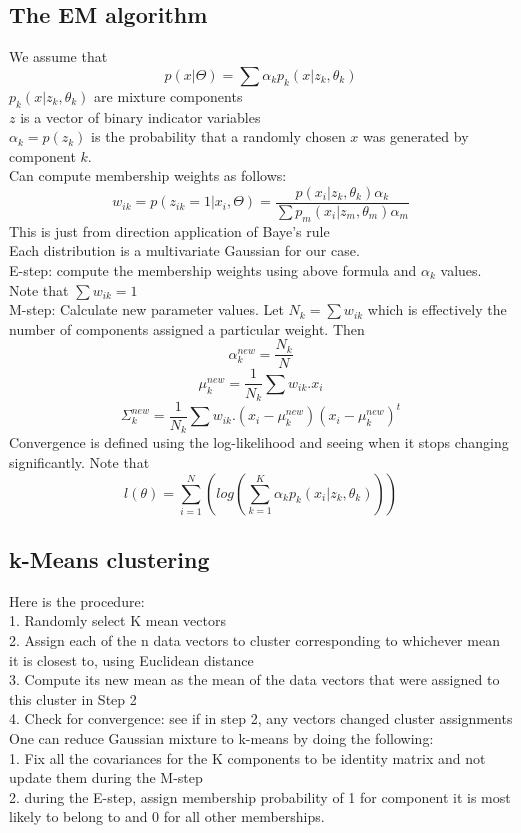 \documentclass[11pt,psfig]{article}
\begin{document}
\subsection*{The EM algorithm}

We assume that
\[
p(x|\Theta) = \sum{\alpha_k p_k(x|z_k,\theta_k)}
\]
$p_k(x|z_k,\theta_k)$ are mixture components\\
$z$ is a vector of binary indicator variables\\
$\alpha_k = p(z_k)$ is the probability that a randomly chosen $x$ was generated by component $k$. \\
Can compute membership weights as follows:
\[
w_{ik} = p(z_{ik}=1|x_i,\Theta) = \frac{p(x_i|z_k,\theta_k)\alpha_k}{\sum{p_m(x_i|z_m,\theta_m)\alpha_m}}
\]
This is just from direction application of Baye's rule\\
Each distribution is a multivariate Gaussian for our case. \\
E-step: compute the membership weights using above formula and $\alpha_k$ values. \\
Note that $\sum{w_{ik}} = 1$
\\
M-step: Calculate new parameter values. Let $N_k = \sum{w_{ik}}$ which is effectively the number of components assigned a particular weight. Then
\[
\alpha_k^{new} = \frac{N_k}{N}
\]
\[
\mu_k^{new} = \frac{1}{N_k} \sum{w_{ik}.x_i}
\]
\[
\Sigma_k^{new} = \frac{1}{N_k} \sum{w_{ik}.(x_i-\mu_k^{new})(x_i-\mu_k^{new})^t}
\]
Convergence is defined using the log-likelihood and seeing when it stops changing significantly. Note that
\[
l(\theta) = \sum_{i=1}^N{(log(\sum_{k=1}^K{\alpha_k p_k(x_i|z_k,\theta_k)}))}
\]

\subsection*{k-Means clustering}

Here is the procedure:\\
1. Randomly select K mean vectors\\
2. Assign each of the n data vectors to cluster corresponding to whichever mean it is closest to, using Euclidean distance\\
3. Compute its new mean as the mean of the data vectors that were assigned to this cluster in Step 2\\
4. Check for convergence: see if in step 2, any vectors changed cluster assignments\\
One can reduce Gaussian mixture to k-means by doing the following:\\
1. Fix all the covariances for the K components to be identity matrix and not update them during the M-step\\
2. during the E-step, assign membership probability of 1 for component it is most likely to belong to and 0 for all other memberships. 
\end{document}
